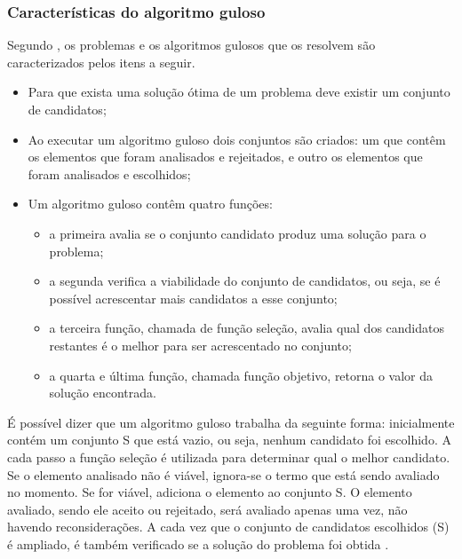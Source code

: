 \subsubsection{Características do algoritmo guloso}
Segundo \cite{anderson2004}, os problemas e os algoritmos gulosos que os resolvem são caracterizados pelos itens a seguir.
\begin{itemize}
\item Para que exista uma solução ótima de um problema deve existir um conjunto de candidatos;
\item Ao executar um algoritmo guloso dois conjuntos são criados: um que contêm os elementos que foram analisados e rejeitados, e outro os elementos que foram analisados e escolhidos;
\item Um algoritmo guloso contêm quatro funções: 
\begin{itemize}
\item a primeira avalia se o conjunto candidato produz uma solução para o problema; 
\item a segunda verifica a viabilidade do conjunto de candidatos, ou seja, se é possível acrescentar mais candidatos a esse conjunto; 
\item a terceira função, chamada de função seleção, avalia qual dos candidatos restantes é o melhor para ser acrescentado no conjunto; 
\item a quarta e última função, chamada função objetivo, retorna o valor da solução encontrada.
\end{itemize} 
\end{itemize}
É possível dizer que um algoritmo guloso trabalha da seguinte forma: inicialmente contém um conjunto S que está vazio, ou seja, nenhum candidato foi escolhido. A cada passo a função seleção é utilizada para determinar qual o melhor candidato. Se o elemento analisado não é viável, ignora-se o termo que está sendo avaliado no momento. Se for viável, adiciona o elemento ao conjunto S. O elemento avaliado, sendo ele aceito ou rejeitado, será avaliado apenas uma vez, não havendo reconsiderações. A cada vez que o conjunto de candidatos escolhidos (S) é ampliado, é também verificado se a solução do problema foi obtida \cite{anderson2004}.  
